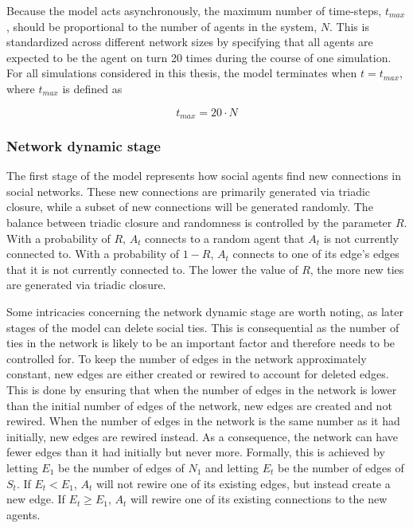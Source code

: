 \documentclass[11pt]{article}
\begin{document}
Because the model acts asynchronously, the maximum number of time-steps, $t_{max}$, should be proportional to the number of agents in the system, $N$. This is standardized across different network sizes by specifying that all agents are expected to be the agent on turn 20 times during the course of one simulation. For all simulations considered in this thesis, the model terminates when $t = t_{max}$, where $t_{max}$ is defined as 

$$t_{max} = 20 \cdot N$$

\subsubsection{Network dynamic stage}
\label{network dynamic stage}
The first stage of the model represents how social agents find new connections in social networks. These new connections are primarily generated via triadic closure, while a subset of new connections will be generated randomly. The balance between triadic closure and randomness is controlled by the parameter $R$. With a probability of $R$, $A_t$ connects to a random agent that $A_t$ is not currently connected to. 
With a probability of $1-R$, $A_t$ connects to one of its edge's edges that it is not currently connected to. The lower the value of $R$, the more new ties are generated via triadic closure. 

\noindent Some intricacies concerning the network dynamic stage are worth noting, as later stages of the model can delete social ties. This is consequential as the number of ties in the network is likely to be an important factor and therefore needs to be controlled for. 
To keep the number of edges in the network approximately constant, new edges are either created or rewired to account for deleted edges. 
This is done by ensuring that when the number of edges in the network is lower than the initial number of edges of the network, new edges are created and not rewired. When the number of edges in the network is the same number as it had initially, new edges are rewired instead. As a consequence, the network can have fewer edges than it had initially but never more. 
Formally, this is achieved by letting $E_1$ be the number of edges of $N_1$ and letting $E_t$ be the number of edges of $S_t$. 
If $E_t < E_1$, $A_t$ will not rewire one of its existing edges, but instead create a new edge. If $E_t \geq E_1$, $A_t$ will rewire one of its existing connections to the new agents.
\end{document}
